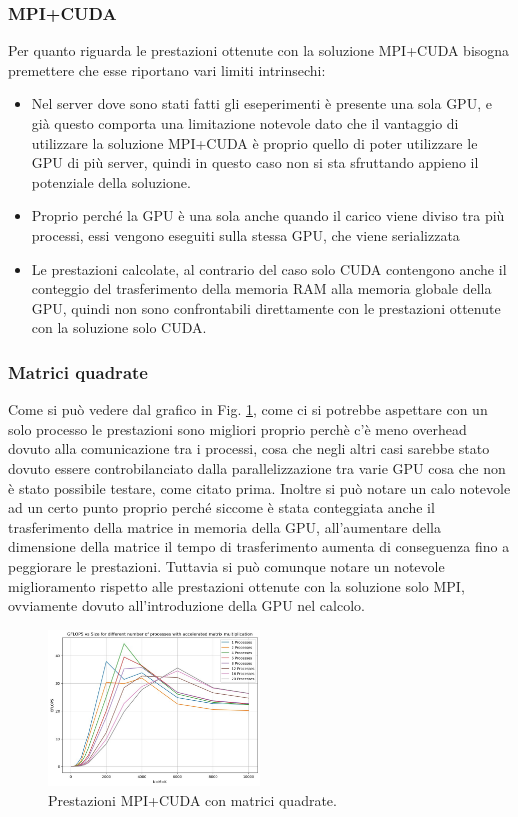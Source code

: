 \documentclass[conference]{IEEEtran}
\begin{document}
\subsubsection{MPI+CUDA}
Per quanto riguarda le prestazioni ottenute con la soluzione MPI+CUDA bisogna premettere che esse riportano vari limiti intrinsechi:
\begin{itemize}
    \item Nel server dove sono stati fatti gli eseperimenti è presente una sola GPU, e già questo comporta una limitazione notevole dato che il vantaggio di utilizzare la soluzione MPI+CUDA è proprio quello di poter utilizzare le GPU di più server, quindi in questo caso non si sta sfruttando appieno il potenziale della soluzione.
    \item Proprio perché la GPU è una sola anche quando il carico viene diviso tra più processi, essi vengono eseguiti sulla stessa GPU, che viene serializzata
    \item Le prestazioni calcolate, al contrario del caso solo CUDA contengono anche il conteggio del trasferimento della memoria RAM alla memoria globale della GPU, quindi non sono confrontabili direttamente con le prestazioni ottenute con la soluzione solo CUDA.
\end{itemize}

\subsubsection{Matrici quadrate}
Come si può vedere dal grafico in Fig. \ref{fig:mpi_cuda_square}, come ci si potrebbe aspettare con un solo processo le prestazioni sono migliori proprio perchè c'è meno overhead dovuto alla comunicazione tra i processi, cosa che negli altri casi sarebbe stato dovuto essere controbilanciato dalla parallelizzazione tra varie GPU cosa che non è stato possibile testare, come citato prima. 
Inoltre si può notare un calo notevole ad un certo punto proprio perché siccome è stata conteggiata anche il trasferimento della matrice in memoria della GPU, all'aumentare della dimensione della matrice il tempo di trasferimento aumenta di conseguenza fino a peggiorare le prestazioni. Tuttavia si può comunque notare un notevole miglioramento rispetto alle prestazioni ottenute con la soluzione solo MPI, ovviamente dovuto all'introduzione della GPU nel calcolo.
\begin{figure}[H]
    \centering
    \includegraphics[width=0.5\textwidth]{resources/mpi_cuda_square.jpg}
    \caption{Prestazioni MPI+CUDA con matrici quadrate.}
    \label{fig:mpi_cuda_square}
\end{figure}
\end{document}
